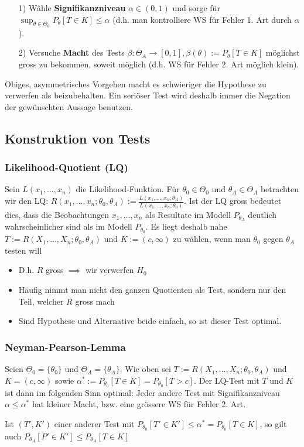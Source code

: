 \begin{itemize}
        \begin{itemize}
            \item[1)] Wähle \textbf{Signifikanzniveau} $\alpha \in (0, 1)$ und sorge für $\sup_{\theta \in \Theta_0} P_\theta[T \in K] \le \alpha$ (d.h. man kontrolliere WS für Fehler 1. Art durch $\alpha$).
            \item[2)] Versuche \textbf{Macht} des Tests $\beta: \Theta_A \to [0, 1], \beta(\theta) := P_\theta[T \in K]$ möglichst gross zu bekommen, soweit möglich (d.h. WS für Fehler 2. Art möglich klein).
        \end{itemize}
    Obiges, asymmetrisches Vorgehen macht es schwieriger die Hypothese zu verwerfen als beizubehalten. Ein seriöser Test wird deshalb immer die Negation der gewünschten Aussage benutzen.
\end{itemize}

\subsection{Konstruktion von Tests}
\subsubsection{Likelihood-Quotient (LQ)}
Sein $L(x_1, \dots, x_n)$ die Likelihood-Funktion. Für $\theta_0 \in \Theta_0$ und $\theta_A \in \Theta_A$ betrachten wir den LQ: $R(x_1, \dots, x_n; \theta_0, \theta_A) := \frac{L(x_1, \dots, x_n; \theta_A)}{L(x_1, \dots, x_n; \theta_0)}$. Ist der LQ gross bedeutet dies, dass die Beobachtungen $x_1, \dots, x_n$ als Resultate im Modell $P_{\theta_A}$ deutlich wahrscheinlicher sind als im Modell $P_{\theta_0}$. Es liegt deshalb nahe $T:= R(X_1, \dots, X_n; \theta_0, \theta_A)$ und $K := (c, \infty)$ zu wählen, wenn man $\theta_0$ gegen $\theta_A$ testen will
\begin{itemize}
    \item D.h. $R$ gross $\implies$ wir verwerfen $H_0$
    \item Häufig nimmt man nicht den ganzen Quotienten als Test, sondern nur den Teil, welcher $R$ gross mach
    \item Sind Hypothese und Alternative beide einfach, so ist dieser Test optimal.
\end{itemize}

\subsubsection{Neyman-Pearson-Lemma}
Seien $\Theta_0 = \{\theta_0\}$ und $\Theta_A = \{\theta_A\}$. Wie oben sei $T := R(X_1, \dots, X_n; \theta_0, \theta_A)$ und $K = (c, \infty)$ sowie $\alpha^* := P_{\theta_0}[T \in K] = P_{\theta_0}[T > c]$. Der LQ-Test mit $T$ und $K$ ist dann im folgenden Sinn optimal: Jeder andere Test mit Signifikanzniveau $\alpha \le \alpha^*$ hat kleiner Macht, bzw. eine grössere WS für Fehler 2. Art.
\begin{itemize}
     Ist $(T', K')$ einer anderer Test mit $P_{\theta_0}[T' \in K'] \le \alpha^* = P_{\theta_0}[T \in K]$, so gilt auch $P_{\theta_A}[P' \in K'] \le P_{\theta_A}[T \in K]$
\end{itemize}

